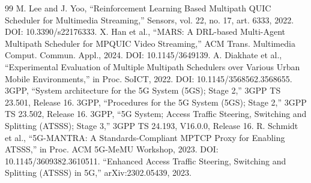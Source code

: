 \documentclass[preprint,11pt]{elsarticle}
\begin{document}
\begin{thebibliography}{99}
 M. Lee and J. Yoo, ``Reinforcement Learning Based Multipath QUIC Scheduler for Multimedia Streaming,'' Sensors, vol. 22, no. 17, art. 6333, 2022. DOI: 10.3390/s22176333.
 X. Han et al., ``MARS: A DRL-based Multi-Agent Multipath Scheduler for MPQUIC Video Streaming,'' ACM Trans. Multimedia Comput. Commun. Appl., 2024. DOI: 10.1145/3649139.
 A. Diakhate et al., ``Experimental Evaluation of Multiple Multipath Schedulers over Various Urban Mobile Environments,'' in Proc. SoICT, 2022. DOI: 10.1145/3568562.3568655.
 3GPP, ``System architecture for the 5G System (5GS); Stage 2,'' 3GPP TS 23.501, Release 16.
 3GPP, ``Procedures for the 5G System (5GS); Stage 2,'' 3GPP TS 23.502, Release 16.
 3GPP, ``5G System; Access Traffic Steering, Switching and Splitting (ATSSS); Stage 3,'' 3GPP TS 24.193, V16.0.0, Release 16.
 R. Schmidt et al., ``5G-MANTRA: A Standards-Compliant MPTCP Proxy for Enabling ATSSS,'' in Proc. ACM 5G-MeMU Workshop, 2023. DOI: 10.1145/3609382.3610511.
 ``Enhanced Access Traffic Steering, Switching and Splitting (ATSSS) in 5G,'' arXiv:2302.05439, 2023.
\end{thebibliography}
\end{document}
